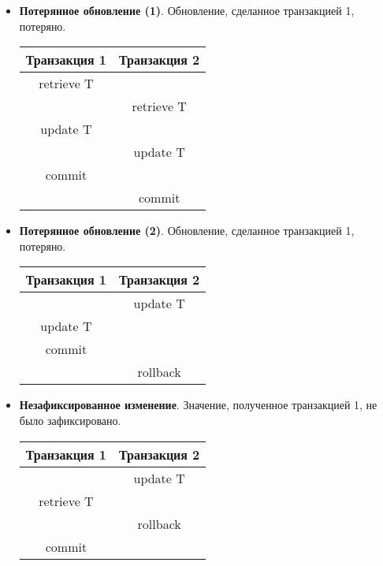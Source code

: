 \begin{itemize}
    \item \textbf{Потерянное обновление (1)}. Обновление, сделанное транзакцией 1, потеряно.
        \begin{center}
            \begin{tabular}{|c c|}
                \hline
                Транзакция 1 & Транзакция 2 \\
                \hline
                retrieve T & \\
                & retrieve T \\
                update T & \\
                & update T \\
                commit & \\
                & commit \\
                \hline
            \end{tabular}
        \end{center}
    \item \textbf{Потерянное обновление (2)}. Обновление, сделанное транзакцией 1, потеряно.
        \begin{center}
            \begin{tabular}{|c c|}
                \hline
                Транзакция 1 & Транзакция 2 \\
                \hline
                & update T \\
                update T & \\
                commit & \\
                & rollback \\
                \hline
            \end{tabular}
        \end{center}
    \item \textbf{Незафиксированное изменение}. Значение, полученное транзакцией 1, не было
        зафиксировано.
        \begin{center}
            \begin{tabular}{|c c|}
                \hline
                Транзакция 1 & Транзакция 2 \\
                \hline
                & update T \\
                retrieve T & \\
                & rollback \\
                commit & \\
                \hline
            \end{tabular}

\end{center}
\end{itemize}
